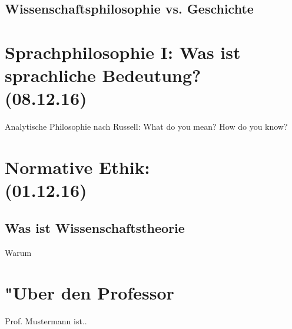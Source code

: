 \documentclass[emulatestandardclasses]{scrartcl}
\begin{document}
\subsection{Wissenschaftsphilosophie vs. Geschichte}


\section{Sprachphilosophie I: Was ist sprachliche Bedeutung?\\(08.12.16)}

Analytische Philosophie nach Russell: What do you mean? How do you know?

\section{Normative Ethik: \\(01.12.16)}

\subsection{Was ist Wissenschaftstheorie}

\begin{description}[leftmargin=!,labelwidth=\widthof{\bfseries Poppers Falsifikationismus}]
  \item[Tugendethik] 
  \item[Deontologische Ethik] 
  \item[Konsequentialismus] 
  \item[Probleme] 
\end{description}

Warum

\newpage
\section{"Uber den Professor}
Prof. Mustermann ist..


\end{document}
